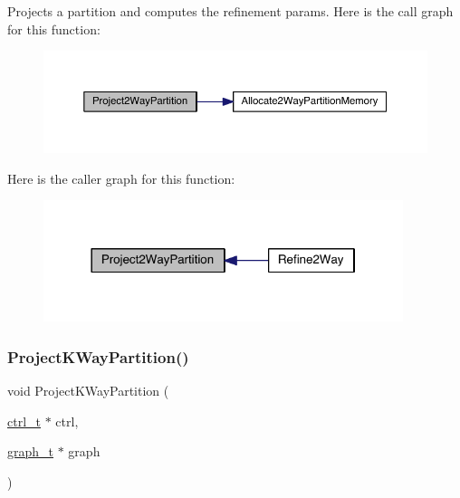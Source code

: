 Projects a partition and computes the refinement params. Here is the call graph for this function\+:\nopagebreak
\begin{figure}[H]
\begin{center}
\leavevmode
\includegraphics[width=350pt]{a00945_a99814e73a646480f8af05e7d8bcfe4bc_cgraph}
\end{center}
\end{figure}
Here is the caller graph for this function\+:\nopagebreak
\begin{figure}[H]
\begin{center}
\leavevmode
\includegraphics[width=298pt]{a00945_a99814e73a646480f8af05e7d8bcfe4bc_icgraph}
\end{center}
\end{figure}
\mbox{\label{a00945_a974cb62c010e195c90f8fb900359957c}} 
\subsubsection{\texorpdfstring{Project\+K\+Way\+Partition()}{ProjectKWayPartition()}}
{\footnotesize\ttfamily void Project\+K\+Way\+Partition (\begin{DoxyParamCaption}\item[{\hyperlink{a00742}{ctrl\+\_\+t} $\ast$}]{ctrl,  }\item[{\hyperlink{a00734}{graph\+\_\+t} $\ast$}]{graph }\end{DoxyParamCaption})}

